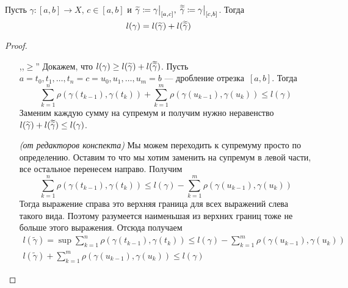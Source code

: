   \begin{theorem}
    Пусть $\gamma\colon [a, b] \to X, \, c \in [a, b]$ и $\widetilde{\gamma} \coloneqq \gamma\smash{\big |_{[a, c]}}, \; \vardbtilde{\gamma} \coloneqq \gamma \smash{\big|_{[c, b]}}$.
    Тогда
    \begin{equation*}
      l(\gamma) = l(\widetilde{\gamma}) + l(\vardbtilde{\gamma})
    \end{equation*}
  \end{theorem}
  \begin{proof}
    \begin{enumerate}
      \item[]
      \item[,,$\geq$''] Докажем, что $l(\gamma) \geq l(\widetilde{\gamma}) + l(\vardbtilde{\gamma})$. Пусть $a = t_0, t_1, \dotsc, t_n = c = u_0, u_1, \dots, u_m = b$ --- дробление отрезка~$[a, b]$. Тогда
      \begin{equation*}
        \sum\limits_{k = 1}^{n} \rho(\gamma(t_{k - 1}), \gamma(t_{k})) +
        \sum\limits_{k = 1}^{m} \rho(\gamma(u_{k - 1}), \gamma(u_{k})) \leq l(\gamma)
      \end{equation*}
      Заменим каждую сумму на супремум и получим нужно неравенство $ l(\widetilde{\gamma}) + l(\vardbtilde{\gamma}) \leq l(\gamma)$.
      \begin{notice}
        \textit{(от редакторов конспекта)} Мы можем переходить к супремуму просто по определению. Оставим то что мы хотим заменить на супремум в левой части, все остальное перенесем направо. Получим
        \begin{equation*}
        \sum\limits_{k = 1}^{n} \rho(\gamma(t_{k - 1}), \gamma(t_{k})) \leq l(\gamma) -
        \sum\limits_{k = 1}^{m} \rho(\gamma(u_{k - 1}), \gamma(u_{k}))
        \end{equation*}
        Тогда выражение справа это верхняя граница для всех выражений слева такого вида. Поэтому разумеется наименьшая из верхних границ тоже не больше этого выражения. Отсюда получаем
        \begin{equation*}
          \begin{gathered}
              l(\widetilde{\gamma}) = \sup \sum\limits_{k = 1}^{n} \rho(\gamma(t_{k - 1}), \gamma(t_{k})) \leq l(\gamma) -
              \sum\limits_{k = 1}^{m} \rho(\gamma(u_{k - 1}), \gamma(u_{k})) \\
              l(\widetilde{\gamma}) +
              \sum\limits_{k = 1}^{m} \rho(\gamma(u_{k - 1}), \gamma(u_{k})) \leq l(\gamma)
          \end{gathered}

\end{equation*}
\end{notice}
\end{enumerate}
\end{proof}
